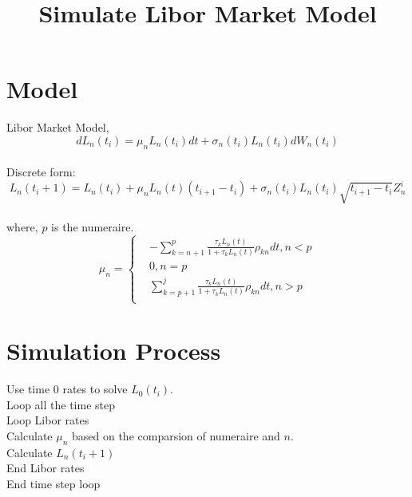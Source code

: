 \documentclass[12pt]{article}
\title{Simulate Libor Market Model}
\begin{document}
\maketitle


\section{Model}


Libor Market Model,
\begin{equation}
    dL_n(t_i)=\mu_n L_n(t_i)dt+\sigma_n(t_i)L_n(t_i)dW_n(t_i)
\end{equation}
\\
Discrete form:
\begin{equation}
    L_n(t_i+1)=L_n(t_i)+\mu_n L_n(t)(t_{i+1}-t_i)+\sigma_n(t_i) L_n(t_i) \sqrt{t_{i+1}-t_i}Z^i_n
\end{equation}
\\
where, $p$ is the numeraire.
\begin{equation}
    \mu_n =\left\{
\begin{aligned}
& -\sum_{k=n+1}^p \frac{\tau_k L_n(t)}{1+\tau_k L_n(t)}\rho_{kn} dt, n<p\\
& 0, n = p\\
& \sum_{k=p+1}^j \frac{\tau_k L_n(t)}{1+\tau_k L_n(t)}\rho_{kn} dt, n>p\\
\end{aligned}
\right.
\end{equation}

\section{Simulation Process}

Use time 0 rates to solve $L_0(t_i)$.
\\
Loop all the time step
\\
Loop Libor rates
\\
Calculate $\mu_n$ based on the comparsion of numeraire and $n$.
\\
Calculate $L_n(t_i+1)$
\\
End Libor rates
\\
End time step loop


\end{document}
